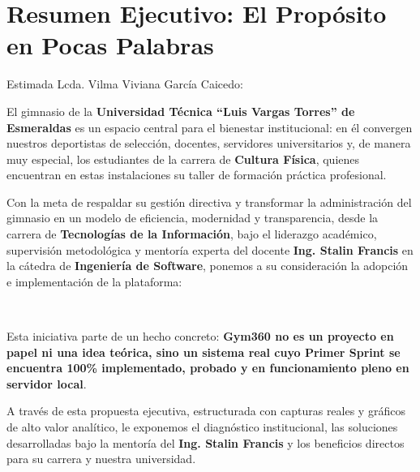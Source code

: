 \documentclass[11pt,a4paper]{article}
\begin{document}
\vspace{2.5mm}

\section{Resumen Ejecutivo: El Propósito en Pocas Palabras}

Estimada Lcda. Vilma Viviana García Caicedo:

El gimnasio de la \textbf{Universidad Técnica ``Luis Vargas Torres'' de Esmeraldas} es un espacio central para el bienestar institucional: en él convergen nuestros deportistas de selección, docentes, servidores universitarios y, de manera muy especial, los estudiantes de la carrera de \textbf{Cultura Física}, quienes encuentran en estas instalaciones su taller de formación práctica profesional.

Con la meta de respaldar su gestión directiva y transformar la administración del gimnasio en un modelo de eficiencia, modernidad y transparencia, desde la carrera de \textbf{Tecnologías de la Información}, bajo el liderazgo académico, supervisión metodológica y mentoría experta del docente \textbf{Ing. Stalin Francis} en la cátedra de \textbf{Ingeniería de Software}, ponemos a su consideración la adopción e implementación de la plataforma:

\begin{center}
    \colorbox{CardBg}{\parbox{0.96\linewidth}{
        \centering \vspace{1.8mm}
        {\Large \textbf{\color{GymPrimary}{Gym360: Plataforma Digital para el Gimnasio Universitario}}}\\[1.2mm]
        \textit{\color{TextDark}{Un sistema moderno, ágil y visualmente intuitivo que sustituye las planillas físicas de papel por un control digitalizado del acceso y aforo en tiempo real, monitoreo patrimonial del equipamiento con fotografías reales, un atlas pedagógico de 27 grupos musculares y un catálogo interactivo de más de 1,000 ejercicios anatómicos para docentes y entrenadores.}}
        \vspace{1.8mm}
    }}
\end{center}

Esta iniciativa parte de un hecho concreto: \textbf{Gym360 no es un proyecto en papel ni una idea teórica, sino un sistema real cuyo Primer Sprint se encuentra 100\% implementado, probado y en funcionamiento pleno en servidor local}. 

A través de esta propuesta ejecutiva, estructurada con capturas reales y gráficos de alto valor analítico, le exponemos el diagnóstico institucional, las soluciones desarrolladas bajo la mentoría del \textbf{Ing. Stalin Francis} y los beneficios directos para su carrera y nuestra universidad.
\end{document}
